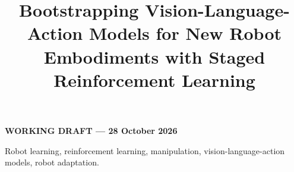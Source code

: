 \documentclass[letterpaper,journal]{IEEEtran}
\begin{document}
\title{Bootstrapping Vision-Language-Action Models for New Robot Embodiments with Staged Reinforcement Learning}
\author{}
\IEEEaftertitletext{\vspace{1em}}
\maketitle
\begin{center}\small\textbf{WORKING DRAFT --- 28 October 2026}\end{center}

\begin{IEEEkeywords}
Robot learning, reinforcement learning, manipulation, vision-language-action models, robot adaptation.
\end{IEEEkeywords}








\end{document}
